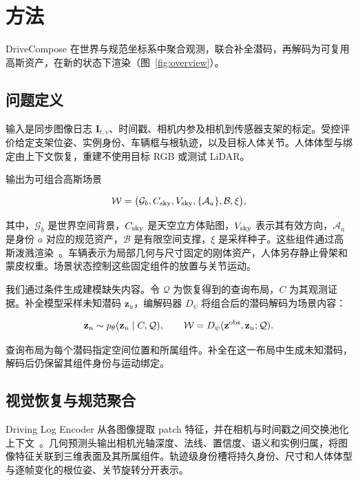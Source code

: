 \section{方法}\label{sec:method}

DriveCompose 在世界与规范坐标系中聚合观测，联合补全潜码，再解码为可复用高斯资产，在新的状态下渲染（图~\ref{fig:overview}）。



\subsection{问题定义}
\label{sec:representation}

输入是同步图像日志 $\mathbf I_{t,v}$、时间戳、相机内参及相机到传感器支架的标定。受控评价给定支架位姿、实例身份、车辆框与根轨迹，以及目标人体关节。人体体型与绑定由上下文恢复，重建不使用目标 RGB 或测试 LiDAR。

输出为可组合高斯场景

\begin{equation}
\mathcal W=\bigl(\mathcal G_b,C_{\rm sky},V_{\rm sky},
\{\mathcal A_a\},\mathcal B,\xi\bigr),
\label{eq:world}
\end{equation}

其中，$\mathcal G_b$ 是世界空间背景，$C_{\rm sky}$ 是天空立方体贴图，$V_{\rm sky}$ 表示其有效方向，$\mathcal A_a$ 是身份 $a$ 对应的规范资产，$\mathcal B$ 是有限空间支撑，$\xi$ 是采样种子。这些组件通过高斯泼溅渲染~\cite{kerbl2023gaussians}。车辆表示为局部几何与尺寸固定的刚体资产，人体另存静止骨架和蒙皮权重。场景状态控制这些固定组件的放置与关节运动。

我们通过条件生成建模缺失内容。令 $\mathcal Q$ 为恢复得到的查询布局，$C$ 为其观测证据。补全模型采样未知潜码 $\mathbf z_u$，编解码器 $D_\psi$ 将组合后的潜码解码为场景内容：

\begin{equation}
\mathbf z_u\sim p_\theta(\mathbf z_u\mid C,\mathcal Q),
\qquad
\mathcal W=D_\psi(\mathbf z^{\rm obs},\mathbf z_u;\mathcal Q).
\label{eq:generative-reconstruction}
\end{equation}

查询布局为每个潜码指定空间位置和所属组件。补全在这一布局中生成未知潜码，解码后仍保留其组件身份与运动绑定。

\subsection{视觉恢复与规范聚合}
\label{sec:visual-encoding}

Driving Log Encoder 从各图像提取 patch 特征，并在相机与时间戳之间交换池化上下文~\cite{dosovitskiy2021vit,vaswani2017attention}。几何预测头输出相机光轴深度、法线、置信度、语义和实例归属，将图像特征关联到三维表面及其所属组件。轨迹级身份槽将持久身份、尺寸和人体体型与逐帧变化的根位姿、关节旋转分开表示。

